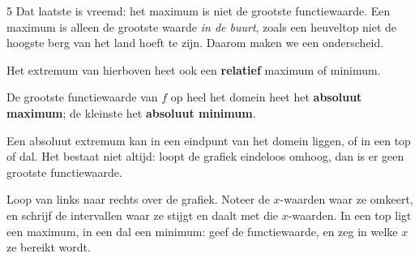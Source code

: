 
\begin{alleenvoor}{5}
Dat laatste is vreemd: het maximum is niet de grootste functiewaarde. Een maximum is alleen de grootste waarde \textit{in de buurt}, zoals een heuveltop niet de hoogste berg van het land hoeft te zijn. Daarom maken we een onderscheid.

\begin{theorie}
Het extremum van hierboven heet ook een \textbf{\textcolor{accent}{relatief}} maximum of minimum.

De grootste functiewaarde van $f$ op heel het domein heet het \textbf{\textcolor{accent}{absoluut maximum}}; de kleinste het \textbf{\textcolor{accent}{absoluut minimum}}.
\end{theorie}

Een absoluut extremum kan in een eindpunt van het domein liggen, of in een top of dal. Het bestaat niet altijd: loopt de grafiek eindeloos omhoog, dan is er geen grootste functiewaarde.

\end{alleenvoor}

\begin{werkwijze}
Loop van links naar rechts over de grafiek. Noteer de $x$-waarden waar ze omkeert, en schrijf de intervallen waar ze stijgt en daalt met die $x$-waarden. In een top ligt een maximum, in een dal een minimum: geef de functiewaarde, en zeg in welke $x$ ze bereikt wordt.
\end{werkwijze}

